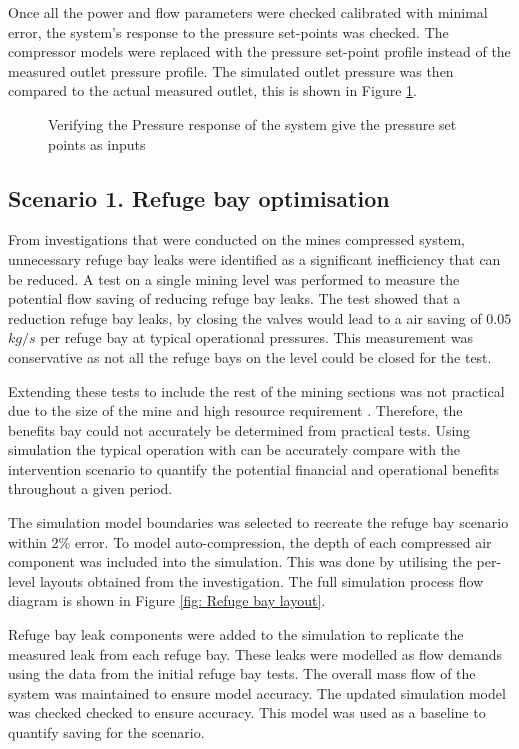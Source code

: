	Once all the power and flow parameters were checked calibrated with minimal error, the system's response to the pressure set-points was checked. The compressor models were replaced with the pressure set-point profile instead of the measured outlet pressure profile. The simulated outlet pressure was then compared to the actual measured outlet, this is shown in Figure \ref{fig: Verification Pressure kusasalethu Setpoint}.

	\begin{figure}[h]
		\centering
		
		\caption{Verifying the Pressure response of the system give the pressure set points as inputs}
		\label{fig: Verification Pressure kusasalethu Setpoint}
	\end{figure}
	\subsection{Scenario 1. Refuge bay optimisation}
	From investigations that were conducted on the mines compressed system, unnecessary refuge bay leaks were identified as a significant inefficiency that can be reduced. A test on a single mining level was performed to  measure the potential flow saving of reducing refuge bay leaks. The test showed that a reduction refuge bay leaks, by closing the valves would lead to a air saving of $0.05$ $kg/s$ per refuge bay at typical operational pressures. This measurement was conservative as not all the refuge bays on the level could be closed for the test. 
	\par 
	Extending these tests to include the rest of the mining sections was not practical due to the size of the mine and high resource requirement . Therefore, the benefits bay could not accurately be determined from practical tests. Using simulation the typical operation with can be accurately compare with the intervention scenario to quantify the potential financial and operational benefits throughout a given period.
	\par
	The simulation model boundaries was selected to recreate the refuge bay scenario within 2\% error. To model auto-compression, the depth of each compressed air component was included into the simulation. This was done by utilising the per-level layouts obtained from the investigation. The full simulation process flow diagram is shown in Figure \ref{fig: Refuge bay layout}.
	\par 
	Refuge bay leak components were added to the simulation to replicate the measured leak from each refuge bay. These leaks were modelled as flow demands using the data from the initial refuge bay tests. The overall mass flow of the system was maintained to ensure model accuracy. The updated simulation model was checked checked to ensure accuracy. This model was used as a baseline to quantify saving for the scenario. 
